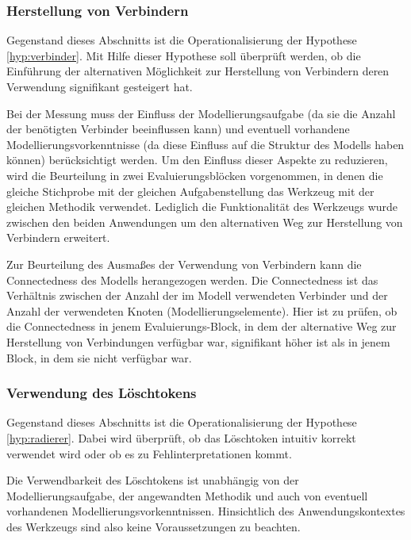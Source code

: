 \subsubsection{Herstellung von Verbindern} %
\label{ssub:herstellung_von_verbindern}

Gegenstand dieses Abschnitts ist die Operationalisierung der Hypothese \ref{hyp:verbinder}. Mit Hilfe dieser Hypothese soll überprüft werden, ob die Einführung der alternativen Möglichkeit zur Herstellung von Verbindern deren Verwendung signifikant gesteigert hat.

Bei der Messung muss der Einfluss der Modellierungsaufgabe (da sie die Anzahl der benötigten Verbinder beeinflussen kann) und eventuell vorhandene Modellierungsvorkenntnisse (da diese Einfluss auf die Struktur des Modells haben können) berücksichtigt werden. Um den Einfluss dieser Aspekte zu reduzieren, wird die Beurteilung in zwei Evaluierungsblöcken vorgenommen, in denen die gleiche Stichprobe mit der gleichen Aufgabenstellung das Werkzeug mit der gleichen Methodik verwendet. Lediglich die Funktionalität des Werkzeugs wurde zwischen den beiden Anwendungen um den alternativen Weg zur Herstellung von Verbindern erweitert.  

Zur Beurteilung des Ausmaßes der Verwendung von Verbindern kann die Connectedness des Modells herangezogen werden. Die Connectedness ist das Verhältnis zwischen der Anzahl der im Modell verwendeten Verbinder und der Anzahl der verwendeten Knoten (Modellierungselemente). Hier ist zu prüfen, ob die Connectedness in jenem Evaluierungs-Block, in dem der alternative Weg zur Herstellung von Verbindungen verfügbar war, signifikant höher ist als in jenem Block, in dem sie nicht verfügbar war.


\subsubsection{Verwendung des Löschtokens} %
\label{ssub:löschtoken}

Gegenstand dieses Abschnitts ist die Operationalisierung der Hypothese \ref{hyp:radierer}. Dabei wird überprüft, ob das Löschtoken intuitiv korrekt verwendet wird oder ob es zu Fehlinterpretationen kommt.

Die Verwendbarkeit des Löschtokens ist unabhängig von der Modellierungsaufgabe, der angewandten Methodik und auch von eventuell vorhandenen Modellierungsvorkenntnissen. Hinsichtlich des Anwendungskontextes des Werkzeugs sind also keine Voraussetzungen zu beachten.


